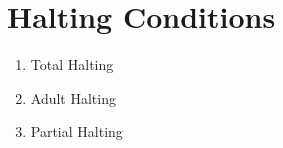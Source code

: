 \documentclass[a4paper]{article}
\theoremstyle{definition}
\begin{document}

\section{Halting Conditions}\label{app-halt}

\begin{enumerate}
\item Total Halting
\item Adult Halting
\item Partial Halting 
\end{enumerate}



\end{document}
